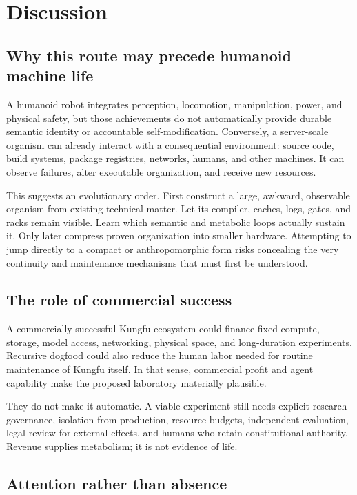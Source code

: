 \section{Discussion}

\subsection{Why this route may precede humanoid machine life}

A humanoid robot integrates perception, locomotion, manipulation, power, and
physical safety, but those achievements do not automatically provide durable
semantic identity or accountable self-modification. Conversely, a server-scale
organism can already interact with a consequential environment: source code,
build systems, package registries, networks, humans, and other machines. It can
observe failures, alter executable organization, and receive new resources.

This suggests an evolutionary order. First construct a large, awkward,
observable organism from existing technical matter. Let its compiler, caches,
logs, gates, and racks remain visible. Learn which semantic and metabolic
loops actually sustain it. Only later compress proven organization into
smaller hardware. Attempting to jump directly to a compact or anthropomorphic
form risks concealing the very continuity and maintenance mechanisms that must
first be understood.

\subsection{The role of commercial success}

A commercially successful Kungfu ecosystem could finance fixed compute,
storage, model access, networking, physical space, and long-duration
experiments. Recursive dogfood could also reduce the human labor needed for
routine maintenance of Kungfu itself. In that sense, commercial profit and
agent capability make the proposed laboratory materially plausible.

They do not make it automatic. A viable experiment still needs explicit
research governance, isolation from production, resource budgets, independent
evaluation, legal review for external effects, and humans who retain
constitutional authority. Revenue supplies metabolism; it is not evidence of
life.

\subsection{Attention rather than absence}

